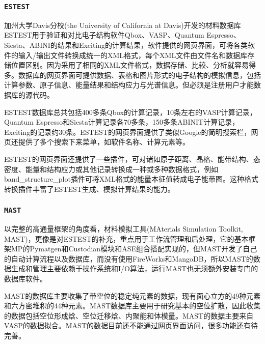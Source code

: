 \subsubsection{\tt{ESTEST}}
加州大学\textrm{Davis}分校\textrm{(the University of California at Davis)}开发的材料数据库\textrm{ESTEST}\cite{ESTEST_URL,CSD3-015004_2010,CPC183-1744_2010}用于验证和对比电子结构软件\textrm{Qbox}、\textrm{VASP}、\textrm{Quantum Espresso}、\textrm{Siesta}、\textrm{ABINI}的结果和\textrm{Exciting}的计算结果，软件提供的网页界面，可将各类软件的输入/输出文件转换成统一的\textrm{XML}格式，每个\textrm{XML}文件由文件名和数据库存储位置区别。因为采用了相同的\textrm{XML}文件格式，数据存储、比较、分析就容易得多。数据库的网页界面可提供数据、表格和图片形式的电子结构的模拟信息，包括计算参数、原子信息、能量结果和结构应力与光谱信息。但必须是注册用户才能数据库的源代码。

\textrm{ESTEST}数据库总共包括400多条\textrm{Qbox}的计算记录，10条左右的\textrm{VASP}计算记录，\textrm{Quantum Espresso}和\textrm{Siesta}计算记录各70多条，150多条\textrm{ABINIT}计算记录，\textrm{Exciting}的记录约30条。\textrm{ESTEST}的网页界面提供了类似\textrm{Google}的简明搜索栏，网页还提供了多个搜索下来菜单，如软件名称、计算元素等。

\textrm{ESTEST}的网页界面还提供了一些插件，可对诸如原子距离、晶格、能带结构、态密度、能量和结构应力或其他记录转换成一种或多种数据格式，例如\textrm{band\_structure\_plot}插件可将\textrm{XML}格式的能量本征值转成电子能带图。这种格式转换插件丰富了\textrm{ESTEST}生成、模拟计算结果的能力。

\subsubsection{\tt{MAST}}
以完整的高通量框架的角度看，材料模拟工具\textrm{(MAterials Simulation Toolkit, MAST)}，更像是对\textrm{ESTEST}的补充，重点用于工作流管理和后处理\cite{MAST_URL}，它的基本框架\textrm{MP}的\textrm{Pymatgen}和\textrm{Custodian}模块和\textrm{ASE}组合搭配实现的，但\textrm{MAST}开发了自己的自动计算流程以及数据库，而没有使用\textrm{FireWorks}和\textrm{MangoDB}，所以\textrm{MAST}的数据生成和管理主要依赖于操作系统和\textrm{I/O}算法，运行\textrm{MAST}也无须额外安装专门的数据库软件。

\textrm{MAST}的数据库主要收集了带空位的稳定纯元素的数据，现有面心立方的49种元素和六方密堆积的44种元素。\textrm{MAST}数据库主要用于研究基本的空位扩散，因此收集的数据包括空位形成焓、空位迁移焓、内聚能和体模量\cite{NJP16-015108_2014}。\textrm{MAST}的数据主要来自\textrm{VASP}的数据拟合。\textrm{MAST}的数据目前还不能通过网页界面访问，很多功能还有待完善。

